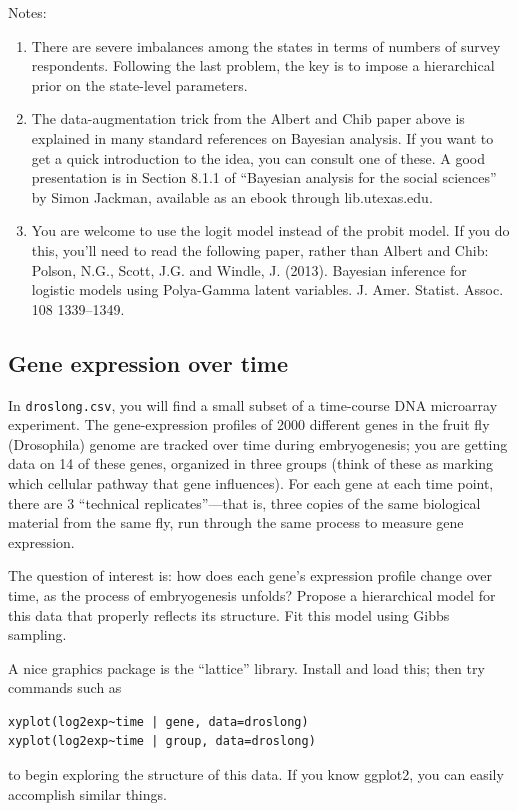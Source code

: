 \documentclass{article}
\begin{document}
Notes:
\begin{enumerate}
\item There are severe imbalances among the states in terms of numbers of survey respondents. Following the last problem, the key is to impose a hierarchical prior on the state-level parameters.
\item The data-augmentation trick from the Albert and Chib paper above is explained in many standard references on Bayesian analysis.  If you want to get a quick introduction to the idea, you can consult one of these.  A good presentation is in Section 8.1.1 of ``Bayesian analysis for the social sciences'' by Simon Jackman, available as an ebook through lib.utexas.edu.
\item You are welcome to use the logit model instead of the probit model.  If you do this, you'll need to read the following paper, rather than Albert and Chib: Polson, N.G., Scott, J.G. and Windle, J. (2013). Bayesian inference for logistic models using Polya-Gamma latent variables. J. Amer. Statist. Assoc. 108 1339--1349.  
\end{enumerate}


\subsection{Gene expression over time}

In \verb|droslong.csv|, you will find a small subset of a time-course DNA microarray experiment.  The gene-expression profiles of 2000 different genes in the fruit fly (Drosophila) genome are tracked over time during embryogenesis; you are getting data on 14 of these genes, organized in three groups (think of these as marking which cellular pathway that gene influences).  For each gene at each time point, there are 3 ``technical replicates''---that is, three copies of the same biological material from the same fly, run through the same process to measure gene expression.

The question of interest is: how does each gene's expression profile change over time, as the process of embryogenesis unfolds?  Propose a hierarchical model for this data that properly reflects its structure.  Fit this model using Gibbs sampling.

A nice graphics package is the ``lattice'' library.  Install and load this; then try commands such as
\begin{verbatim}
xyplot(log2exp~time | gene, data=droslong)
xyplot(log2exp~time | group, data=droslong)
\end{verbatim}
to begin exploring the structure of this data.  If you know ggplot2, you can easily accomplish similar things.
\end{document}
